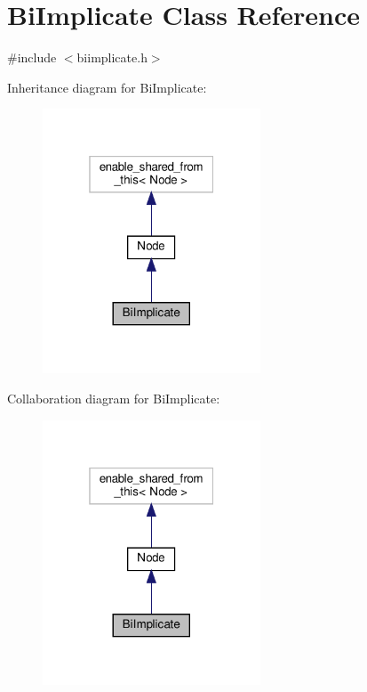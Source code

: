 \hypertarget{class_bi_implicate}{}\section{Bi\+Implicate Class Reference}
\label{class_bi_implicate}


{\ttfamily \#include $<$biimplicate.\+h$>$}



Inheritance diagram for Bi\+Implicate\+:\nopagebreak
\begin{figure}[H]
\begin{center}
\leavevmode
\includegraphics[width=184pt]{da/d01/class_bi_implicate__inherit__graph}
\end{center}
\end{figure}


Collaboration diagram for Bi\+Implicate\+:\nopagebreak
\begin{figure}[H]
\begin{center}
\leavevmode
\includegraphics[width=184pt]{d5/d7f/class_bi_implicate__coll__graph}
\end{center}
\end{figure}
